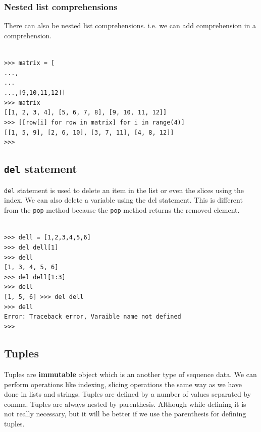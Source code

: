 \documentclass[12pt,a4paper]{article}
\begin{document}
\subsubsection{Nested list comprehensions}
There can also be nested list comprehensions. i.e. we can add comprehension in a comprehension. 

\texttt{\\
>>> matrix = [\\
...\hspace{30pt}{[1,2,3,4]},\\
...\hspace{30pt}{[5,6,7,8]}\\
...\hspace{30pt},{[9,10,11,12]]}\\
>>> matrix\\
{[[1, 2, 3, 4], [5, 6, 7, 8], [9, 10, 11, 12]]}\\
>>> [[row[i] for row in matrix] for i in range(4)]\\
{[[1, 5, 9], [2, 6, 10], [3, 7, 11], [4, 8, 12]]}\\
>>> \\
}
\subsection{\texttt{del} statement}
\texttt{del} statement is used to delete an item in the list or even the slices using the index. We can also delete a variable using the del statement. This is different from the \texttt{pop} method because the \texttt{pop} method returns the removed element.

\texttt{\\
>>> dell = [1,2,3,4,5,6]\\
>>> del dell[1]\\
>>> dell\\
{[1, 3, 4, 5, 6]}\\
>>> del dell[1:3]\\
>>> dell\\
{[1, 5, 6]}
>>> del dell\\
>>> dell\\
Error: Traceback error, Varaible name not defined\\
>>> \\}

\subsection{Tuples}
Tuples are \textbf{immutable} object which is an another type of sequence data. We can perform operations like indexing, slicing operations the same way as we have done in lists and strings. Tuples are defined by a number of values separated by comma.   Tuples are always nested by parenthesis. Although while defining it is not really necessary, but it will be better if we use the parenthesis for defining tuples. 
\end{document}
